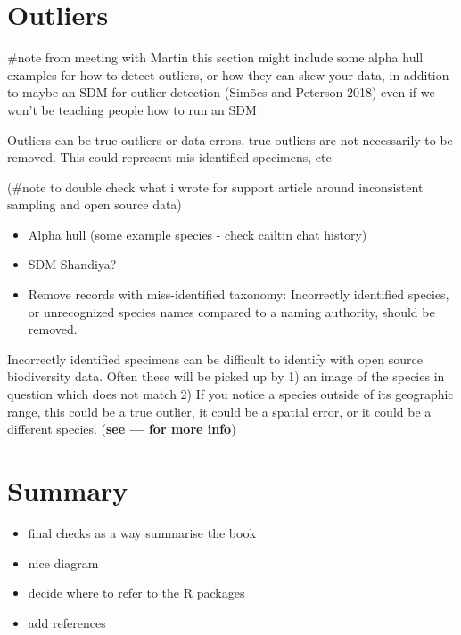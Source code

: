 \documentclass[
  letterpaper,
  DIV=11,
  numbers=noendperiod,
  oneside]{scrreprt}
\providecommand{\tightlist}{%
  \setlength{\itemsep}{0pt}\setlength{\parskip}{0pt}}\usepackage{longtable,booktabs,array}
\begin{document}

\hypertarget{outliers}{%
\chapter{Outliers}\label{outliers}}

\#note from meeting with Martin this section might include some alpha
hull examples for how to detect outliers, or how they can skew your
data, in addition to maybe an SDM for outlier detection (Simões and
Peterson 2018) even if we won't be teaching people how to run an SDM

Outliers can be true outliers or data errors, true outliers are not
necessarily to be removed. This could represent mis-identified
specimens, etc

(\#note to double check what i wrote for support article around
inconsistent sampling and open source data)

\begin{itemize}
\item
  Alpha hull (some example species - check cailtin chat history)
\item
  SDM Shandiya?
\item
  Remove records with miss-identified taxonomy: Incorrectly identified
  species, or unrecognized species names compared to a naming authority,
  should be removed.
\end{itemize}

Incorrectly identified specimens can be difficult to identify with open
source biodiversity data. Often these will be picked up by 1) an image
of the species in question which does not match 2) If you notice a
species outside of its geographic range, this could be a true outlier,
it could be a spatial error, or it could be a different species.
(\textbf{see --- for more info})


\hypertarget{summary}{%
\chapter{Summary}\label{summary}}

\begin{itemize}
\tightlist
\item
  final checks as a way summarise the book
\item
  nice diagram
\item
  decide where to refer to the R packages
\item
  add references
\end{itemize}
\end{document}
